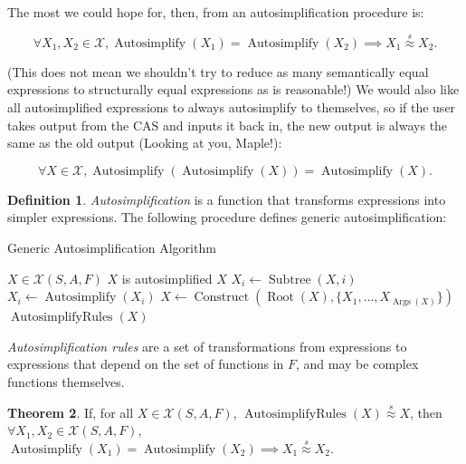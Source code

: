 \documentclass{article}
\theoremstyle{definition}
\newtheorem{thm}{Theorem}[section]
\newtheorem{defin}[thm]{Definition}
\DeclareMathOperator{\Autosimplify}{Autosimplify}
\DeclareMathOperator{\arules}{AutosimplifyRules}
\DeclareMathOperator{\construct}{Construct}
\DeclareMathOperator{\Root}{Root}
\DeclareMathOperator{\subtree}{Subtree}
\DeclareMathOperator{\args}{Args}
\begin{document}
The most we could hope for, then, from an autosimplification procedure is:

\begin{equation*}
    \forall X_1, X_2 \in \mathcal{X}, \Autosimplify(X_1) = \Autosimplify(X_2) \implies X_1 \overset{s}{\approx} X_2. 
\end{equation*}


(This does not mean we shouldn't try to reduce as many semantically equal expressions to structurally equal expressions as is reasonable!) We would also like all autosimplified expressions to always autosimplify to themselves, so if the user takes output from the CAS and inputs it back in, the new output is always the same as the old output (Looking at you, Maple!):

\begin{equation*}
    \forall X \in \mathcal{X}, \Autosimplify(\Autosimplify(X)) = \Autosimplify(X).
\end{equation*}

\begin{defin} \label{def5}
    \emph{Autosimplification} is a function that transforms expressions into simpler expressions. The following procedure defines generic autosimplification: 
    
    \begin{algorithm}\small
    \caption{Generic Autosimplification Algorithm}
        \begin{algorithmic}[1]
            \Require $X \in \mathcal{X}(S, A, F)$
            \Ensure $X$ is autosimplified  
                \State \Return $X$
            \Else
                \For{$i \in \{1, \ldots, \args(X)\}$}
                    \State $X_i \gets \subtree(X, i)$
                    \State $X_i \gets \Autosimplify(X_i)$
                \EndFor
                \State $X \gets \construct(\Root(X), \{X_1, \ldots, X_{\args(X)}\})$
                \State \Return $\arules(X)$
            \EndIf
        \end{algorithmic}
    \end{algorithm}
\end{defin}

\emph{Autosimplification rules} are a set of transformations from expressions to expressions that depend on the set of functions in $F$, and may be complex functions themselves.

\begin{thm}
    If, for all $ X \in \mathcal{X}(S, A, F)$, $\arules(X) \overset{s}{\approx} X$, then $\forall X_1, X_2 \in \mathcal{X}(S, A, F)$, $\Autosimplify(X_1) = \Autosimplify(X_2) \implies X_1 \overset{s}{\approx} X_2$. 
\end{thm}
\end{document}
